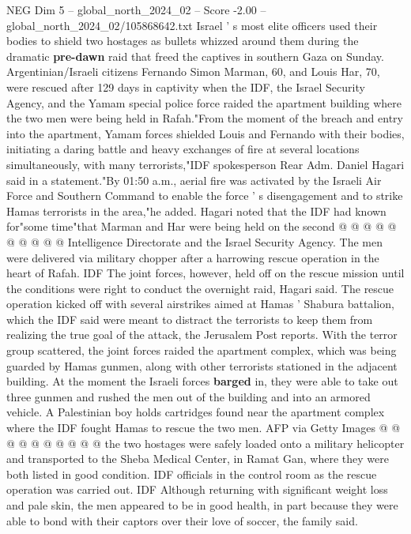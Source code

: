 \begin{textsample}{NEG Dim 5 – global\_north\_2024\_02 – Score -2.00 – global\_north\_2024\_02/105868642.txt}  \label{ex:f5_neg_211}
Israel ' s most elite officers used their bodies to shield two hostages as bullets whizzed around them during the dramatic \textbf{pre-dawn} raid that freed the captives in southern Gaza on Sunday.
Argentinian/Israeli citizens Fernando Simon Marman, 60, and Louis Har, 70, were rescued after 129 days in captivity when the IDF, the Israel Security Agency, and the Yamam special police force raided the apartment building where the two men were being held in Rafah."From the moment of the breach and entry into the apartment, Yamam forces shielded Louis and Fernando with their bodies, initiating a daring battle and heavy exchanges of fire at several locations simultaneously, with many terrorists,"IDF spokesperson Rear Adm.
Daniel Hagari said in a statement."By 01:50 a.m., aerial fire was activated by the Israeli Air Force and Southern Command to enable the force ' s disengagement and to strike Hamas terrorists in the area,"he added.
Hagari noted that the IDF had known for"some time"that Marman and Har were being held on the second @ @ @ @ @ @ @ @ @ @ Intelligence Directorate and the Israel Security Agency.
The men were delivered via military chopper after a harrowing rescue operation in the heart of Rafah.
IDF The joint forces, however, held off on the rescue mission until the conditions were right to conduct the overnight raid, Hagari said.
The rescue operation kicked off with several airstrikes aimed at Hamas ' Shabura battalion, which the IDF said were meant to distract the terrorists to keep them from realizing the true goal of the attack, the Jerusalem Post reports.
With the terror group scattered, the joint forces raided the apartment complex, which was being guarded by Hamas gunmen, along with other terrorists stationed in the adjacent building.
At the moment the Israeli forces \textbf{barged} in, they were able to take out three gunmen and rushed the men out of the building and into an armored vehicle.
A Palestinian boy holds cartridges found near the apartment complex where the IDF fought Hamas to rescue the two men.
AFP via Getty Images @ @ @ @ @ @ @ @ @ @ the two hostages were safely loaded onto a military helicopter and transported to the Sheba Medical Center, in Ramat Gan, where they were both listed in good condition.
IDF officials in the control room as the rescue operation was carried out.
IDF Although returning with significant weight loss and pale skin, the men appeared to be in good health, in part because they were able to bond with their captors over their love of soccer, the family said.

\end{textsample}

